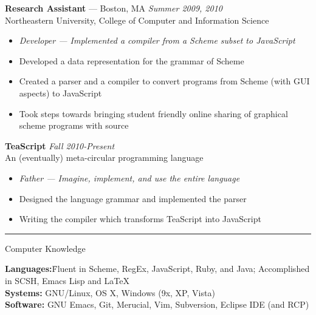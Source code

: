 \documentclass[10pt]{letter}
\begin{document}
\begin{tabbing}
{\large \bf Research Assistant} --- Boston, MA \` \textit{Summer 2009, 2010} \\
Northeastern University, College of Computer and Information Science
\end{tabbing}\vspace{-10pt}
\begin{itemize}
\setlength\itemsep{1pt}
\item [] \textit{Developer --- Implemented a compiler from a Scheme subset to JavaScript}
\item Developed a data representation for the grammar of Scheme
\item Created a parser and a compiler to convert programs from Scheme (with GUI aspects) to JavaScript
\item Took steps towards bringing student friendly online sharing of graphical scheme programs with source
\end{itemize}

\begin{tabbing}
{\large \bf TeaScript} \` \textit{Fall 2010-Present} \\
An (eventually) meta-circular programming language

\end{tabbing}\vspace{-10pt}

\begin{itemize}
\setlength\itemsep{1pt}
\item [] \textit{Father --- Imagine, implement, and use the entire language }
\item Designed the language grammar and implemented the parser
\item Writing the compiler which transforms TeaScript into JavaScript
\end{itemize}

\rule{\linewidth}{.5pt}


{\Large Computer Knowledge}
\begin{tabbing}
\textbf{Languages:}\hspace{.2in}\= Fluent in Scheme, RegEx, JavaScript, Ruby,
                   and Java; Accomplished in SCSH, Emacs Lisp and \LaTeX\\
\textbf{Systems:}\> GNU/Linux, OS X, Windows (9x, XP, Vista)\\
\textbf{Software:}\> GNU Emacs, Git, Merucial, Vim, Subversion,
                     Eclipse IDE (and RCP)
\end{tabbing}\vspace{-15pt}
\end{document}
